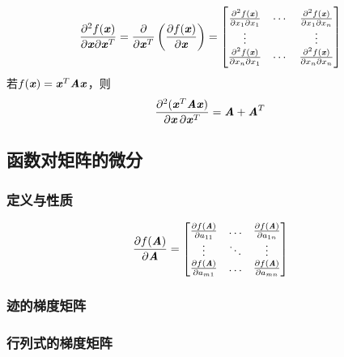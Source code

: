 \begin{definition}[Hessian矩阵]
    \[
        \frac{\partial^2 f(\boldsymbol{\mathit{x}})}{\partial \boldsymbol{\mathit{x}} \partial \boldsymbol{\mathit{x}}^T } = \frac{\partial}{\partial \boldsymbol{\mathit{x}}^T} \left(\frac{\partial f(\boldsymbol{\mathit{x}})}{\partial \boldsymbol{\mathit{x}}} \right) = \begin{bmatrix}
            \frac{\partial^2 f(\boldsymbol{\mathit{x}})}{\partial x_1 \partial x_1} &  \cdots & \frac{\partial^2 f(\boldsymbol{\mathit{x}})}{\partial x_1 \partial x_n} \\
            \vdots & & \vdots \\
            \frac{\partial^2 f(\boldsymbol{\mathit{x}})}{\partial x_n \partial x_1} &  \cdots & \frac{\partial^2 f(\boldsymbol{\mathit{x}})}{\partial x_n \partial x_n}
        \end{bmatrix}
    \]
    若$f(\boldsymbol{\mathit{x}}) = \boldsymbol{\mathit{x}}^T\boldsymbol{\mathit{A}}\boldsymbol{\mathit{x}}$，则
    \[
        \frac{\partial^2(\boldsymbol{\mathit{x}}^T\boldsymbol{\mathit{A}}\boldsymbol{\mathit{x}})}{\partial \boldsymbol{\mathit{x}} \, \partial \boldsymbol{\mathit{x}}^T} = \boldsymbol{\mathit{A}} + \boldsymbol{\mathit{A}}^T
    \]
\end{definition}

\subsection{函数对矩阵的微分}
\label{sub:函数对矩阵的微分}

\subsubsection{定义与性质}
\label{ssub:定义与性质}

\begin{definition}
    $$
    \frac{\partial f(\boldsymbol{\mathit{A}})}{\partial \boldsymbol{\mathit{A}}} = \begin{bmatrix}
        \frac{\partial f(\boldsymbol{\mathit{A}})}{\partial a_{11}}     &   \ldots  &   \frac{\partial f(\boldsymbol{\mathit{A}})}{\partial a_{1n}} \\
        \vdots                                      &   \ddots  &   \vdots                                  \\
        \frac{\partial f(\boldsymbol{\mathit{A}})}{\partial a_{m1}}     &   \ldots  &   \frac{\partial f(\boldsymbol{\mathit{A}})}{\partial a_{mn}}
    \end{bmatrix}
    $$
\end{definition}

\subsubsection{迹的梯度矩阵}
\label{ssub:迹的梯度矩阵}

\subsubsection{行列式的梯度矩阵}
\label{ssub:行列式的梯度矩阵}

